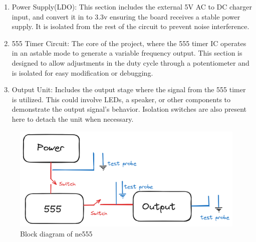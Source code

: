 \documentclass[a4paper,11pt]{article}%
\begin{document}
\begin{enumerate}
	\item Power Supply(LDO): This section includes the external 5V AC to DC charger input, and convert it in to 3.3v ensuring the board receives a stable power supply. It is isolated from the rest of the circuit to prevent noise interference.
	\item 555 Timer Circuit: The core of the project, where the 555 timer IC operates in an astable mode to generate a variable frequency output. This section is designed to allow adjustments in the duty cycle through a potentiometer and is isolated for easy modification or debugging.
	\item Output Unit: Includes the output stage where the signal from the 555 timer is utilized. This could involve LEDs, a speaker, or other components to demonstrate the output signal's behavior. Isolation switches are also present here to detach the unit when necessary.
\end{enumerate}

\begin{figure}[H]
	\centering
	\includegraphics[scale=0.4]{figures/ne555_blockdiagram}
	\caption{Block diagram of ne555}
\end{figure}
\end{document}
